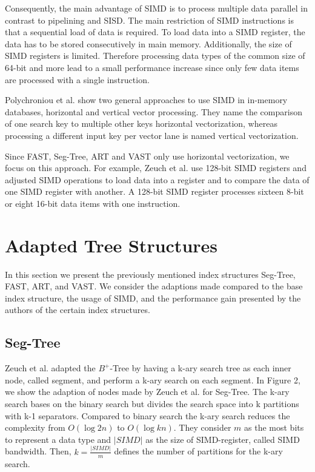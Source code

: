 \documentclass[conference]{IEEEtran}
\begin{document}
Consequently, the main advantage of SIMD is to process multiple data parallel in contrast to pipelining and SISD. The main restriction of SIMD instructions is that a sequential load of data is required. To load data into a SIMD register, the data has to be stored consecutively in main memory. Additionally, the size of SIMD registers is limited. Therefore processing data types of the common size of 64-bit and more lead to a small performance increase since only few data items are processed with a single instruction.

Polychroniou et al. \cite{b7} show two general approaches to use SIMD in in-memory databases, horizontal and vertical vector processing. They name the comparison of one search key to multiple other keys horizontal vectorization, whereas processing a different input key per vector lane is named vertical vectorization.

Since FAST, Seg-Tree, ART and VAST only use horizontal vectorization, we focus on this approach.  For example, Zeuch et al. \cite{b3} use 128-bit SIMD registers and adjusted SIMD operations to load data into a register and to compare the data of one SIMD register with another. A 128-bit SIMD register processes sixteen 8-bit or eight 16-bit data items with one instruction. %


\section{Adapted Tree Structures}
In this section we present the previously mentioned index structures Seg-Tree, FAST, ART, and VAST. We consider the adaptions made compared to the base index structure, the usage of SIMD, and the performance gain presented by the authors of the certain index structures.
\subsection{Seg-Tree}\label{SCM}
Zeuch et al. adapted the $B^+$-Tree by having a k-ary search tree as each inner node, called segment, and perform a k-ary search on each segment.  In Figure 2, we show the adaption of nodes made by Zeuch et al. for Seg-Tree. The k-ary search bases on the binary search but divides the search space into k partitions with k-1 separators. Compared to binary search the k-ary search reduces the complexity from $O(\log{2}{n})$ to $O(\log{k}{n})$. They consider $m$ as the most bits to represent a data type and $\vert SIMD \vert$ as the size of SIMD-register, called SIMD bandwidth. Then, $k = \frac{\vert SIMD \vert }{m}$ defines the number of partitions for the k-ary search. 
\end{document}
